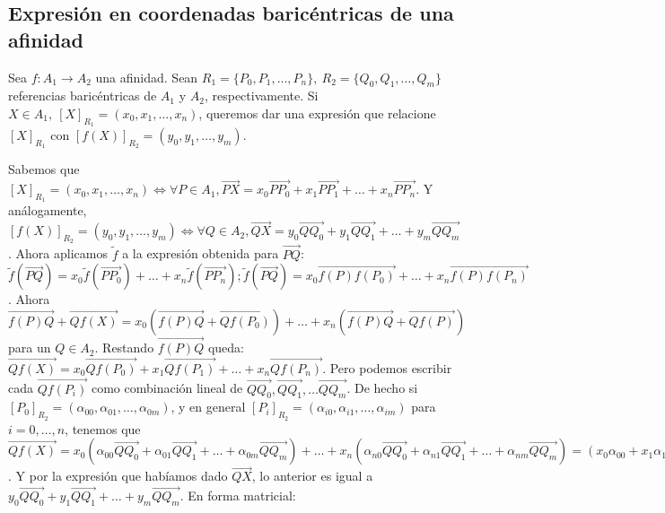 \documentclass[14pt]{book}
\begin{document}
\subsection{Expresión en coordenadas baricéntricas de una afinidad}
Sea $f: A_1 \to A_2$ una afinidad. Sean $R_1 = \{P_0, P_1, \dots, P_n\},\ R_2 = \{Q_0, Q_1, \dots, Q_m\}$ referencias baricéntricas de $A_1$ y $A_2$, respectivamente. Si $X \in A_1,\ [X]_{R_1} = (x_0, x_1, \dots, x_n)$, queremos dar una expresión que relacione $[X]_{R_1}$ con $[f(X)]_{R_2} = (y_0, y_1, \dots, y_m)$.

Sabemos que $[X]_{R_1} = (x_0, x_1, \dots, x_n) \iff \forall P \in A_1, \overrightarrow{PX} = x_0 \overrightarrow{P P_0} + x_1 \overrightarrow{P P_1} + \dots  + x_n \overrightarrow{P P_n}$. Y análogamente, $[f(X)]_{R_2} = (y_0, y_1, \dots, y_m) \iff \forall Q \in A_2, \overrightarrow{QX} = y_0 \overrightarrow{Q Q_0} + y_1 \overrightarrow{Q Q_1} + \dots  + y_m \overrightarrow{Q Q_m}$. Ahora aplicamos $\tilde{f}$ a la expresión obtenida para $\overrightarrow{PQ}$: $\tilde{f}(\overrightarrow{PQ}) = x_0 \tilde{f}(\overrightarrow{P P_0}) + \dots + x_n\tilde{f}(\overrightarrow{P P_n}); \tilde{f}(\overrightarrow{PQ}) = x_0 \overrightarrow{f(P) f(P_0)} + \dots + x_n \overrightarrow{f(P) f(P_n)}$. Ahora $\overrightarrow{f(P)Q} + \overrightarrow{Qf(X)} = x_0 (\overrightarrow{f(P)Q} + \overrightarrow{Qf(P_0)}) + \dots + x_n (\overrightarrow{f(P) Q} + \overrightarrow{Qf(P)})$ para un $Q \in A_2$. Restando $\overrightarrow{f(P) Q}$ queda: $\overrightarrow{Q f(X)} = x_0 \overrightarrow{Q f(P_0)} + x_1 \overrightarrow{Qf(P_1)} + \dots + x_n\overrightarrow{Q f(P_n)}$. Pero podemos escribir cada $\overrightarrow{Qf(P_i)}$ como combinación lineal de $\overrightarrow{QQ_0}, \overrightarrow{QQ_1}, \dots \overrightarrow{Q Q_m}$. De hecho si $[P_0]_{R_2} = (\alpha_{00}, \alpha_{01}, \dots, \alpha_{0m})$, y en general $[P_i]_{R_2} = (\alpha_{i0}, \alpha_{i1}, \dots, \alpha_{im})$ para $i = 0, \dots, n$, tenemos que $\overrightarrow{Qf(X)} = x_0(\alpha_{00}\overrightarrow{Q Q_0} + \alpha_{01} \overrightarrow{Q Q_1} + \dots + \alpha_{0m} \overrightarrow{Q Q_m}) + \dots + x_n(\alpha_{n0}\overrightarrow{Q Q_0} + \alpha_{n1}\overrightarrow{Q Q_1} + \dots + \alpha_{nm} \overrightarrow{Q Q_m}) = (x_0\alpha_{00} + x_1\alpha_{10} + \dots + x_n\alpha_{n0})\overrightarrow{Q Q_m} + \dots + (x_0\alpha_{nm})\overrightarrow{Q Q_m}$. Y por la expresión que habíamos dado $\overrightarrow{Q X}$, lo anterior es igual a $y_0\overrightarrow{Q Q_0} + y_1 \overrightarrow{Q Q_1} + \dots + y_m \overrightarrow{Q Q_m}$. En forma matricial:
\end{document}
